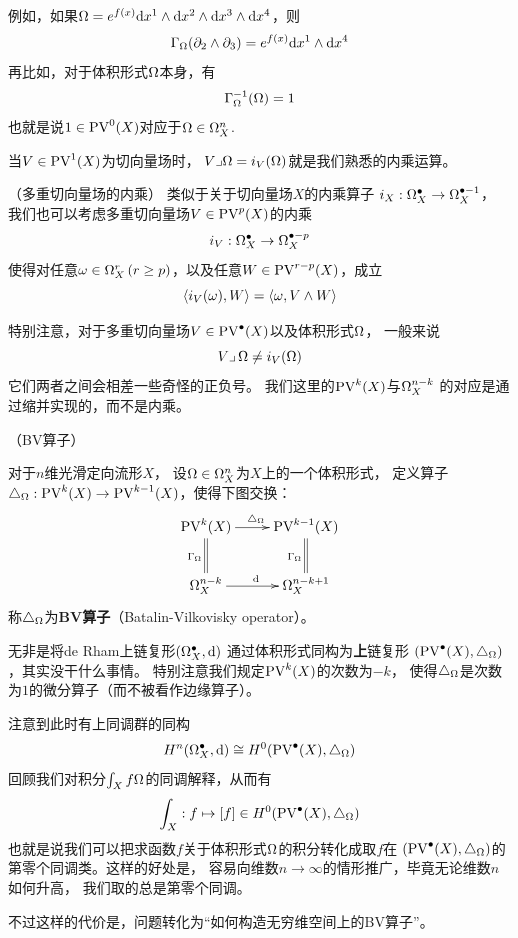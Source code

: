 例如，如果$\Omega=e^{f(x)}\mathrm{d} x^1
\wedge\mathrm{d} x^2\wedge\mathrm{d} x^3\wedge\mathrm{d} x^4$，则
$$\Gamma_\Omega(\partial_2\wedge\partial_3)=e^{f(x)}\mathrm{d} x^1\wedge\mathrm{d} x^4$$
再比如，对于体积形式$\Omega$本身，有
$$\Gamma_\Omega^{-1}(\Omega)=1$$
也就是说$1\in\operatorname{PV}^0(X)$对应于$\Omega\in\Omega^n_X$.

当$V\in\operatorname{PV}^1(X)$为切向量场时，
$V\lrcorner\Omega=i_V(\Omega)$就是我们熟悉的内乘运算。

\begin{rem}（多重切向量场的内乘）
类似于关于切向量场$X$的内乘算子
$i_X:\Omega^{\bullet}_X\to \Omega^{\bullet-1}_X$，
我们也可以考虑多重切向量场$V\in\operatorname{PV}^p(X)$的内乘
$$i_V:\Omega^{\bullet}_X\to\Omega^{\bullet-p}_X$$
使得对任意$\omega\in\Omega^r_X\,(r\geq p)$，以及任意$W\in\operatorname{PV}^{r-p}(X)$，成立
$$\langle i_V(\omega),W\rangle=\langle\omega,V\wedge W\rangle$$
\end{rem}
特别注意，对于多重切向量场$V\in\operatorname{PV}^{\bullet}(X)$以及体积形式$\Omega$，
一般来说
$$V\lrcorner\,\Omega\neq i_V(\Omega)$$
它们两者之间会相差一些奇怪的正负号。
我们这里的$\operatorname{PV}^k(X)$与$\Omega^{n-k}_X$
的对应是通过缩并实现的，而不是内乘。

\begin{definition}（BV算子）

对于$n$维光滑定向流形$X$，
设$\Omega\in\Omega^n_X$为$X$上的一个体积形式，
定义算子$\triangle_\Omega:\operatorname{PV}^{k}(X)\to\operatorname{PV}^{k-1}(X)$，使得下图交换：
$$
  \xymatrix{
     \PV^k(X)        \ar[r]^{\yc_\Omg}  \ar@{=}[d]_{\Gma_\Omg}
    &\PV^{k-1}(X)                       \ar@{=}[d]_{\Gma_\Omg}
  \\
     \Omg_X^{n-k}    \ar[r]^{\td}
    &\Omg_X^{n-k+1}
  }
$$
称$\triangle_\Omega$为\textbf{BV算子}（Batalin-Vilkovisky operator）。
\end{definition}
无非是将de Rham上链复形$(\Omega^{\bullet}_X,\mathrm{d})$
通过体积形式同构为\textbf{上}链复形
$(\operatorname{PV}^{\bullet}(X),\triangle_\Omega)$，其实没干什么事情。
特别注意我们规定$\operatorname{PV}^k(X)$的次数为$-k$，
使得$\triangle_{\Omega}$是次数为$1$的微分算子（而不被看作边缘算子）。

注意到此时有上同调群的同构
$$H^n(\Omega^{\bullet}_X,\mathrm{d})\cong H^0(\operatorname{PV}^{\bullet}(X),\triangle_\Omega)$$
回顾我们对积分$\int_Xf\Omega$的同调解释，从而有
$$\int_X:f\mapsto[f]\in H^0(\operatorname{PV}^{\bullet}(X),\triangle_\Omega)$$
也就是说我们可以把求函数$f$关于体积形式$\Omega$的积分转化成取$f$在
$(\operatorname{PV}^{\bullet}(X),\triangle_\Omega)$的第零个同调类。这样的好处是，
容易向维数$n\to\infty$的情形推广，毕竟无论维数$n$如何升高，
我们取的总是第零个同调。

不过这样的代价是，问题转化为“如何构造无穷维空间上的BV算子”。

